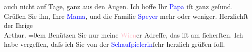                auch nicht auf Tage, ganz aus den Augen.\pend
           \pstart
           Ich hoffe Ihr \textcolor{blue}{Papa}{} iſt ganz
               geſund. Grüßen Sie ihn, Ihre \textcolor{blue}{Mama}{}, und {\pb}die Familie \textcolor{blue}{Speyer}{}\ledrightnote{\textcolor{blue}{Nanette Speyer}{\newline}\textcolor{blue}{Albert Speyer}} mehr oder weniger.\pend
           \pstart
           Herzlichſt der Ihrige{\\[\baselineskip]}\spacefill\mbox{Arthur.}\pend
           \leftskip=0em{}\pstart
           Benützen Sie nur meine \textcolor{pink}{Wien}{}\ledrightnote{\textcolor{pink}{Wien}}er Adreſſe, das iſt am
               ſicherſten. Ich habe vergeſſen, daſs ich Sie von der \textcolor{blue}{Schauſpielerin}{}ſehr herzlich grüßen ſoll.\pend
           \endnumbering{}  
      